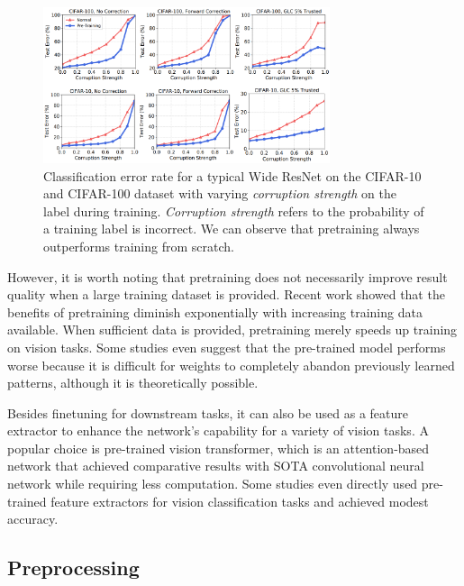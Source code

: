 \begin{figure}
    \centering
    \includegraphics[width=0.75\textwidth]{images/introduction/pretrain_robustness.png}
    \caption{Classification error rate for a typical Wide ResNet\cite{zagoruykoWideResidualNetworks2017} on the CIFAR-10 and CIFAR-100 dataset with varying \textit{corruption strength} on the label during training. \textit{Corruption strength} refers to the probability of a training label is incorrect. We can observe that pretraining always outperforms training from scratch.} 
    \label{fig:pretrain_robustness}
\end{figure}

However, it is worth noting that pretraining does not necessarily improve result quality when a large training dataset is provided. Recent work showed that the benefits of pretraining diminish exponentially with increasing training data available. When sufficient data is provided, pretraining merely speeds up training on vision tasks\cite{heRethinkingImageNetPretraining2018}. Some studies even suggest that the pre-trained model performs worse because it is difficult for weights to completely abandon previously learned patterns, although it is theoretically possible\cite{el-noubyAreLargescaleDatasets2021}. 

Besides finetuning for downstream tasks, it can also be used as a feature extractor to enhance the network's capability for a variety of vision tasks. A popular choice is pre-trained vision transformer\cite{dosovitskiyImageWorth16x162021}, which is an attention-based network that achieved comparative results with SOTA convolutional neural network while requiring less computation. Some studies even directly used pre-trained feature extractors for vision classification tasks and achieved modest accuracy\cite{awaisCanPretrainedConvolutional2020}.


\subsection{Preprocessing}

